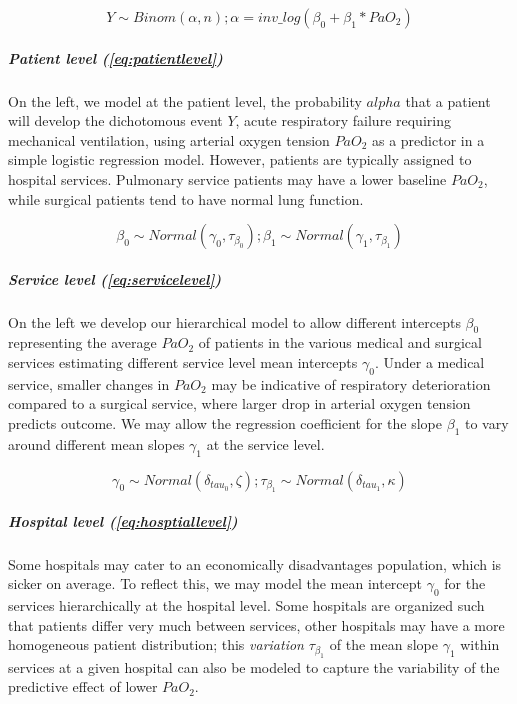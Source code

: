 \documentclass[11pt,notitlepage]{article}
\begin{document}
\begin{figure}
 \begin{equation} \label{eq:patientlevel}
 Y \sim Binom (\alpha, n); \alpha = inv\_log (\beta_{0} +\beta_{1} * PaO_2)
 \end{equation}
\vspace{-25pt}
\end{figure}

\subparagraph*{Patient level (\ref{eq:patientlevel})}
On the left, we model at the patient level, the probability $alpha$ that a patient will develop the dichotomous event $Y$, acute respiratory failure requiring mechanical ventilation, using arterial oxygen tension $PaO_{2}$ as a predictor in a simple logistic regression model. However, patients are typically assigned to hospital services. Pulmonary service patients may have a lower baseline $PaO_2$, while surgical patients tend to have normal lung function. 

\begin{figure}
\begin{equation} \label{eq:servicelevel}
 \beta_{0} \sim Normal (\gamma_0 , \tau_{\beta_0}); \beta_{1} \sim Normal (\gamma_1, \tau_{\beta_1})
\end{equation}
\end{figure}

\subparagraph*{Service level (\ref{eq:servicelevel})}
On the left we develop our hierarchical model to allow different intercepts $\beta_{0}$ representing the average $PaO_2$ of patients in the various medical and surgical services estimating different service level mean intercepts $\gamma_0$. Under a medical service, smaller changes in $PaO_2$ may be indicative of respiratory deterioration compared to a surgical service, where larger drop in arterial oxygen tension predicts outcome. We may allow the regression coefficient for the slope $\beta_{1}$ to vary around different mean slopes $\gamma_1$ at the service level. 

\begin{figure}
\begin{equation} \label{eq:hosptiallevel}
\gamma_0 \sim Normal (\delta_{tau_{0}}, \zeta); \tau_{\beta_1} \sim Normal(\delta_{tau_{1}}, \kappa) 
\end{equation}
\end{figure}

\subparagraph*{Hospital level (\ref{eq:hosptiallevel})}
Some hospitals may cater to an economically disadvantages population, which is sicker on average. To reflect this, we may  model the mean intercept $\gamma_0$ for the services hierarchically at the hospital level. Some hospitals are organized such that patients differ very much between services, other hospitals may have a more homogeneous patient distribution; this \textit{variation} $\tau_{\beta_1}$ of the mean slope $\gamma_1$ within services at a given hospital can also be modeled to capture the variability of the predictive effect of lower $PaO_2$.
 
\end{document}
